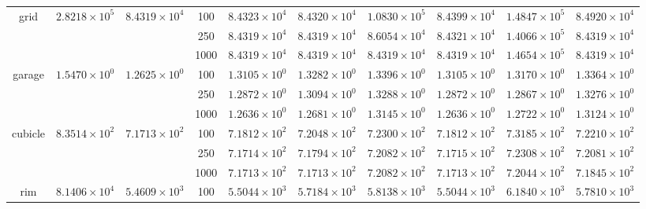 \begin{table*}[t]
\begin{tabular}{|c||c|c||c|c|c||c|c|c|c|}
		\hline
    \multirow{3}{*}{\sf grid} &\multirow{3}{*}{$2.8218\times 10^5$} &\multirow{3}{*}{$8.4319\times 10^4$}
    &100 & {\color{blue}$8.4323\times 10^{4}$} & \color{red}$8.4320\times 10^{4}$ & $1.0830\times 10^5$ & $8.4399\times 10^4$ & $1.4847\times 10^5$ & $8.4920\times 10^4$  \\
		\cline{4-10}
		& &
    &250 & {\color{ao}$8.4319\times 10^{4}$} & \color{ao}$8.4319\times 10^{4}$ & $8.6054\times 10^4$ & $8.4321\times 10^4$ & $1.4066\times 10^5$ & \color{ao}$8.4319\times 10^4$  \\
		\cline{4-10}
		& &
    &1000 & \color{ao}$8.4319\times 10^{4}$ & \color{ao}$8.4319\times 10^{4}$ & \color{ao}$8.4319\times 10^4$ & \color{ao}$8.4319\times 10^4$ & $1.4654\times 10^5$ & \color{ao}$8.4319\times 10^4$  \\
		\hline
    \multirow{3}{*}{\sf garage} &\multirow{3}{*}{$1.5470\times 10^0$} &\multirow{3}{*}{$1.2625\times 10^0$}
    &100 & \color{red}$1.3105\times 10^0$ & $1.3282\times 10^0$ & $1.3396\times 10^0$ & \color{red}$1.3105\times 10^0$ & $1.3170\times 10^0$ & $1.3364\times 10^0$  \\
		\cline{4-10}
		& &
    &250 & \color{blue}$1.2872\times 10^0$ & $1.3094\times 10^0$ & $1.3288\times 10^0$ & \color{blue}$1.2872\times 10^0$ & \color{red}$1.2867\times 10^0$ & $1.3276\times 10^0$  \\
		\cline{4-10}
		& &
    &1000 & \color{red}$1.2636\times 10^0$ & $1.2681\times 10^0$ & $1.3145\times 10^0$ & \color{red}$1.2636\times 10^0$ & $1.2722\times 10^0$ & $1.3124\times 10^0$  \\
		\hline
    \multirow{3}{*}{\sf cubicle} &\multirow{3}{*}{$8.3514\times 10^2$} &\multirow{3}{*}{$7.1713\times 10^2$}
    &100 & \color{ao}$7.1812\times 10^2$ & $7.2048\times 10^2$ & $7.2300\times 10^2$ & \color{ao}$7.1812\times 10^2$ & $7.3185\times 10^2$ & $7.2210\times 10^2$  \\
		\cline{4-10}
		& &
    &250 & \color{red}$7.1714\times 10^2$ & $7.1794\times 10^2$ & $7.2082\times 10^2$ & \color{blue}$7.1715\times 10^2$ & $7.2308\times 10^2$ & $7.2081\times 10^2$  \\
		\cline{4-10}
		& &
    &1000 & \color{ao}$7.1713\times 10^2$ & \color{ao}$7.1713\times 10^2$ & $7.2082\times 10^2$ & \color{ao}$7.1713\times 10^2$ & $7.2044\times 10^2$ & $7.1845\times 10^2$  \\
		\hline
    \multirow{3}{*}{\sf rim} &\multirow{3}{*}{$8.1406\times 10^4$} &\multirow{3}{*}{$5.4609\times 10^3$}
    &100 & \color{ao}$5.5044\times 10^3$ & $5.7184\times 10^3$ & $5.8138\times 10^3$ & \color{ao}$5.5044\times 10^3$ & $6.1840\times 10^3$ & $5.7810\times 10^3$  \\

\end{tabular}
\end{table*}
